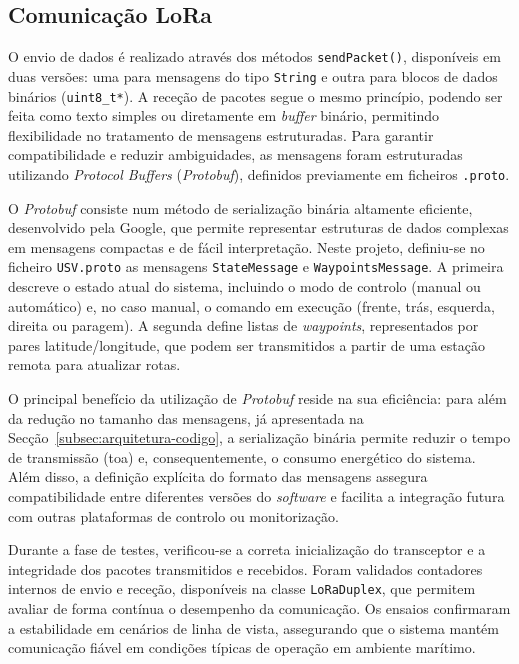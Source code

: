 \subsection{Comunicação LoRa}
\label{subsec:comunicacao-lora}

O envio de dados é realizado através dos métodos \texttt{sendPacket()}, disponíveis em duas versões: uma para mensagens do tipo \texttt{String} e outra para blocos de dados binários (\texttt{uint8\_t*}). A receção de pacotes segue o mesmo princípio, podendo ser feita como texto simples ou diretamente em \emph{buffer} binário, permitindo flexibilidade no tratamento de mensagens estruturadas. Para garantir compatibilidade e reduzir ambiguidades, as mensagens foram estruturadas utilizando \emph{Protocol Buffers} (\emph{Protobuf}), definidos previamente em ficheiros \texttt{.proto}.  

O \emph{Protobuf} consiste num método de serialização binária altamente eficiente, desenvolvido pela Google, que permite representar estruturas de dados complexas em mensagens compactas e de fácil interpretação. Neste projeto, definiu-se no ficheiro \texttt{USV.proto} as mensagens \texttt{StateMessage} e \texttt{WaypointsMessage}. A primeira descreve o estado atual do sistema, incluindo o modo de controlo (manual ou automático) e, no caso manual, o comando em execução (frente, trás, esquerda, direita ou paragem). A segunda define listas de \emph{waypoints}, representados por pares latitude/longitude, que podem ser transmitidos a partir de uma estação remota para atualizar rotas.  

O principal benefício da utilização de \emph{Protobuf} reside na sua eficiência: para além da redução no tamanho das mensagens, já apresentada na Secção~\ref{subsec:arquitetura-codigo}, a serialização binária permite reduzir o tempo de transmissão (\gls{toa}) e, consequentemente, o consumo energético do sistema. Além disso, a definição explícita do formato das mensagens assegura compatibilidade entre diferentes versões do \emph{software} e facilita a integração futura com outras plataformas de controlo ou monitorização.  

Durante a fase de testes, verificou-se a correta inicialização do transceptor e a integridade dos pacotes transmitidos e recebidos. Foram validados contadores internos de envio e receção, disponíveis na classe \texttt{LoRaDuplex}, que permitem avaliar de forma contínua o desempenho da comunicação. Os ensaios confirmaram a estabilidade em cenários de linha de vista, assegurando que o sistema mantém comunicação fiável em condições típicas de operação em ambiente marítimo.  

